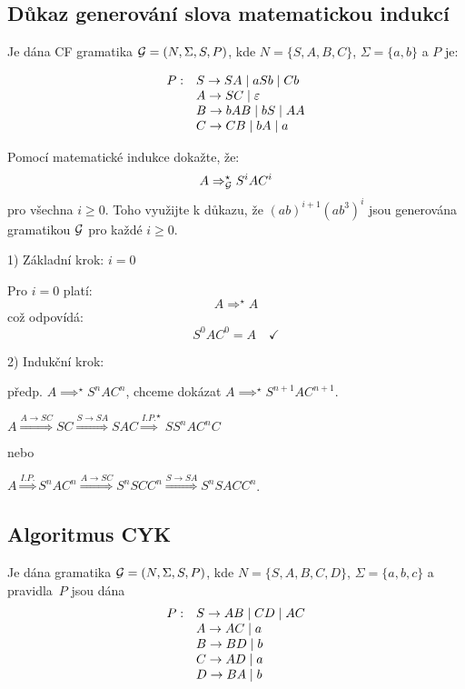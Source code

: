 \subsection{Důkaz generování slova matematickou indukcí} %
Je dána CF gramatika $\mathcal{G} = (N, \Sigma, S, P)$, kde $N = \{S, A, B, C\}$, $\Sigma = \{a, b\}$ a $P$ je:

\[
\begin{array}{l l}
    P: & S \rightarrow SA \mid aSb \mid Cb \\
       & A \rightarrow SC \mid \varepsilon \\
       & B \rightarrow bAB \mid bS \mid AA \\
       & C \rightarrow CB \mid bA \mid a \\
\end{array}
\]

Pomocí matematické indukce dokažte, že:
\[
A \Rightarrow_{\mathcal{G}}^{\star} S^i A C^i
\]
pro všechna $i \geq 0$. Toho využijte k důkazu, že $(ab)^{i+1}(ab^3)^i$ jsou generována gramatikou $\mathcal{G}$ pro 
každé $i \geq 0$.

1) Základní krok: $i = 0$

Pro $i = 0$ platí:
\[
A {\Longrightarrow^\star} A
\]
což odpovídá:
\[
S^0 A C^0 = A \quad \checkmark
\]

2) Indukční krok:

předp. $A {\implies^\star} S^n A C^n$, chceme dokázat $A \implies^{\star} S^{n+1} A C^{n+1}$.

$A \stackrel{A \rightarrow SC}{\Longrightarrow} SC \stackrel{S \rightarrow SA}{\Longrightarrow} SAC \stackrel{I.P.}
{\Longrightarrow}^{\star} SS^nAC^nC$

nebo

$A \stackrel{I.P.}{\Longrightarrow} S^n A C^n \stackrel{A \rightarrow SC}{\Longrightarrow} S^nSCC^n \stackrel
{S \rightarrow SA}{\Longrightarrow} S^nSACC^n$.



\subsection{Algoritmus CYK} %
Je dána gramatika $\mathcal{G} = (N, \Sigma, S, P )$, kde $N = \{S, A, B, C, D\}$, $\Sigma = \{a, b, c\}$ a
pravidla~$P$ jsou dána
\[
\begin{array}{l l}
    P: & S \rightarrow AB \mid CD \mid AC\\
    & A \rightarrow AC \mid a \\
    & B \rightarrow BD \mid b \\
    & C \rightarrow AD \mid a \\
    & D \rightarrow BA \mid b \\ 
\end{array}
\]

